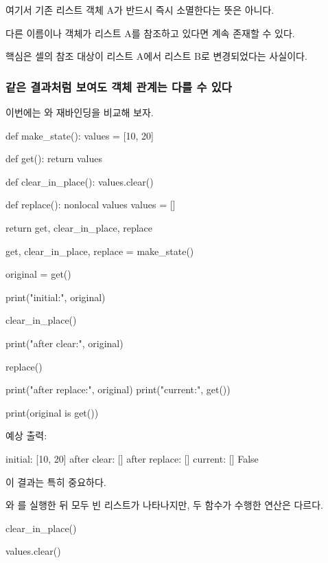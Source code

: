여기서 기존 리스트 객체 A가 반드시 즉시 소멸한다는 뜻은 아니다.

다른 이름이나 객체가 리스트 A를 참조하고 있다면 계속 존재할 수 있다.

핵심은 셀의 참조 대상이 리스트 A에서 리스트 B로 변경되었다는 사실이다.

\subsubsection{같은 결과처럼 보여도 객체 관계는 다를 수 있다}

이번에는 와 재바인딩을 비교해 보자.

\begin{dhkcode}
def make_state():
    values = [10, 20]

    def get():
        return values

    def clear_in_place():
        values.clear()

    def replace():
        nonlocal values
        values = []

    return get, clear_in_place, replace


get, clear_in_place, replace = make_state()

original = get()

print("initial:", original)

clear_in_place()

print("after clear:", original)

replace()

print("after replace:", original)
print("current:", get())

print(original is get())
\end{dhkcode}

예상 출력:

\begin{dhkzsh}
initial: [10, 20]
after clear: []
after replace: []
current: []
False
\end{dhkzsh}

이 결과는 특히 중요하다.

와 를 실행한 뒤 모두 빈 리스트가 나타나지만, 두 함수가 수행한 연산은 다르다.

\begin{dhknote}
\begin{dhksmry}[centered]
clear_in_place()
\end{dhksmry}
\end{dhknote}

\begin{dhkcode}
values.clear()
\end{dhkcode}

